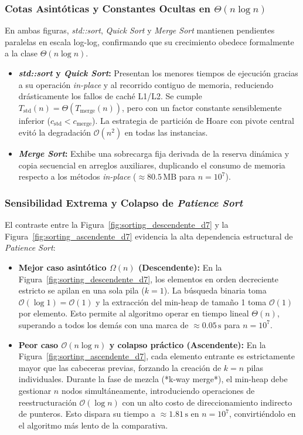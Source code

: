 \subsubsection{Cotas Asintóticas y Constantes Ocultas en $\Theta(n \log n)$}
En ambas figuras, \textit{std::sort}, \textit{Quick Sort} y \textit{Merge Sort} mantienen pendientes paralelas en escala log-log, confirmando que su crecimiento obedece formalmente a la clase $\Theta(n \log n)$. 
\begin{itemize}
    \item \textbf{\textit{std::sort} y \textit{Quick Sort}:} Presentan los menores tiempos de ejecución gracias a su operación \textit{in-place} y al recorrido contiguo de memoria, reduciendo drásticamente los fallos de caché L1/L2. Se cumple $T_{\text{std}}(n) = \Theta(T_{\text{merge}}(n))$, pero con un factor constante sensiblemente inferior ($c_{\text{std}} < c_{\text{merge}}$). La estrategia de partición de Hoare con pivote central evitó la degradación $\mathcal{O}(n^2)$ en todas las instancias.
    \item \textbf{\textit{Merge Sort}:} Exhibe una sobrecarga fija derivada de la reserva dinámica y copia secuencial en arreglos auxiliares, duplicando el consumo de memoria respecto a los métodos \textit{in-place} ($\approx 80.5\,\text{MB}$ para $n=10^7$).
\end{itemize}

\subsubsection{Sensibilidad Extrema y Colapso de \textit{Patience Sort}}
El contraste entre la Figura~\ref{fig:sorting_descendente_d7} y la Figura~\ref{fig:sorting_ascendente_d7} evidencia la alta dependencia estructural de \textit{Patience Sort}:
\begin{itemize}
    \item \textbf{Mejor caso asintótico $\Omega(n)$ (Descendente):} En la Figura~\ref{fig:sorting_descendente_d7}, los elementos en orden decreciente estricto se apilan en una sola pila ($k=1$). La búsqueda binaria toma $\mathcal{O}(\log 1) = \mathcal{O}(1)$ y la extracción del min-heap de tamaño 1 toma $\mathcal{O}(1)$ por elemento. Esto permite al algoritmo operar en tiempo lineal $\Theta(n)$, superando a todos los demás con una marca de $\approx 0.05\,\text{s}$ para $n=10^7$.
    \item \textbf{Peor caso $\mathcal{O}(n \log n)$ y colapso práctico (Ascendente):} En la Figura~\ref{fig:sorting_ascendente_d7}, cada elemento entrante es estrictamente mayor que las cabeceras previas, forzando la creación de $k=n$ pilas individuales. Durante la fase de mezcla (*k-way merge*), el min-heap debe gestionar $n$ nodos simultáneamente, introduciendo operaciones de reestructuración $\mathcal{O}(\log n)$ con un alto costo de direccionamiento indirecto de punteros. Esto dispara su tiempo a $\approx 1.81\,\text{s}$ en $n=10^7$, convirtiéndolo en el algoritmo más lento de la comparativa.
\end{itemize}

